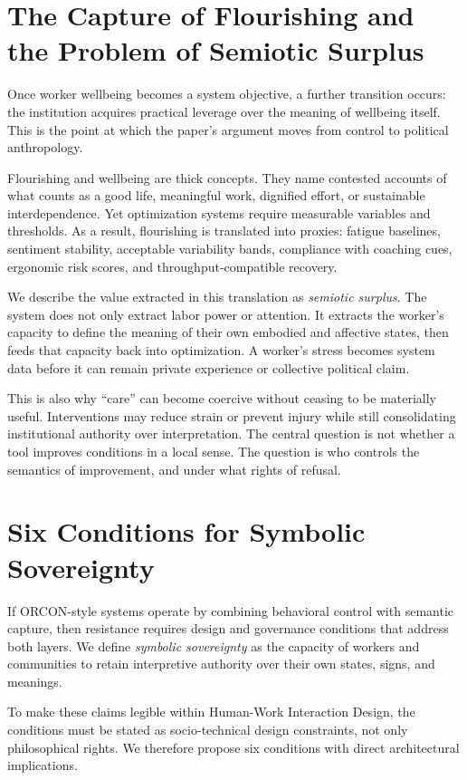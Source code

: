 \documentclass[runningheads]{llncs}
\begin{document}
\section{The Capture of Flourishing and the Problem of Semiotic Surplus}

Once worker wellbeing becomes a system objective, a further transition occurs: the institution acquires practical leverage over the meaning of wellbeing itself. This is the point at which the paper's argument moves from control to political anthropology.

Flourishing and wellbeing are thick concepts. They name contested accounts of what counts as a good life, meaningful work, dignified effort, or sustainable interdependence. Yet optimization systems require measurable variables and thresholds. As a result, flourishing is translated into proxies: fatigue baselines, sentiment stability, acceptable variability bands, compliance with coaching cues, ergonomic risk scores, and throughput-compatible recovery.

We describe the value extracted in this translation as \emph{semiotic surplus}. The system does not only extract labor power or attention. It extracts the worker's capacity to define the meaning of their own embodied and affective states, then feeds that capacity back into optimization. A worker's stress becomes system data before it can remain private experience or collective political claim.

This is also why ``care'' can become coercive without ceasing to be materially useful. Interventions may reduce strain or prevent injury while still consolidating institutional authority over interpretation. The central question is not whether a tool improves conditions in a local sense. The question is who controls the semantics of improvement, and under what rights of refusal.

\section{Six Conditions for Symbolic Sovereignty}

If ORCON-style systems operate by combining behavioral control with semantic capture, then resistance requires design and governance conditions that address both layers. We define \emph{symbolic sovereignty} as the capacity of workers and communities to retain interpretive authority over their own states, signs, and meanings.

To make these claims legible within Human-Work Interaction Design, the conditions must be stated as socio-technical design constraints, not only philosophical rights. We therefore propose six conditions with direct architectural implications.
\end{document}
